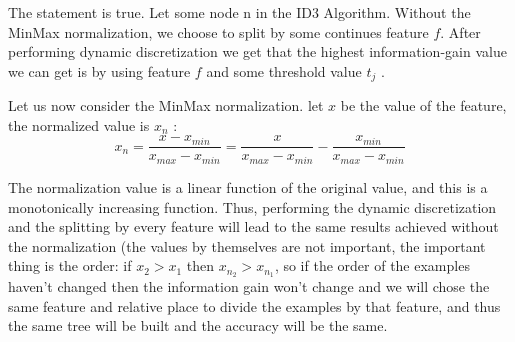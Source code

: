 The statement is true. Let some node n in the ID3 Algorithm. Without the MinMax normalization, we choose to split by some continues feature $f$. After performing dynamic discretization we get that the highest information-gain value we can get is by using feature $f$ and some threshold value $t_{j}$ .

Let us now consider the MinMax normalization. let $x$ be the value of the feature, the normalized value is $x_{n}$ :
\begin{equation*}
    x_{n}=\frac{x-x_{min}}{x_{max}-x_{min}}=\frac{x}{x_{max}-x_{min}}-\frac{x_{min}}{x_{max}-x_{min}}
\end{equation*}

The normalization value is a linear function of the original value, and this is a monotonically increasing function. Thus, performing the dynamic discretization and the splitting by every feature will lead to the same results achieved without the normalization (the values by themselves are not important, the important thing is the order: if $x_{2}>x_{1}$ then $x_{n_{2}}>x_{n_{1}}$, so if the order of the examples haven't changed then the information gain won't change and we will chose the same feature and relative place to divide the examples by that feature, and thus the same tree will be built and the accuracy will be the same.
